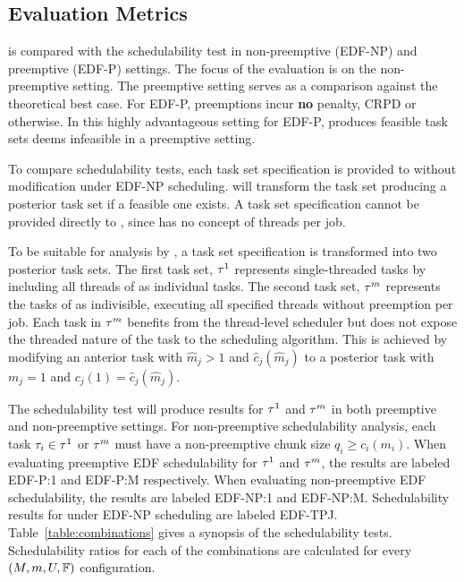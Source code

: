 \subsection{Evaluation Metrics}

\tpj{} is compared with the \npchunks{} schedulability test in
non-preemptive (EDF-NP) and preemptive (EDF-P) settings. The focus of
the evaluation is on the non-preemptive setting. The preemptive
setting serves as a comparison against the theoretical best case. For EDF-P,
preemptions incur \textbf{no} penalty, CRPD or otherwise. In this
highly advantageous setting for EDF-P, \tpj{} produces
feasible task sets \npchunks{} deems infeasible in a
preemptive setting.

To compare schedulability tests, each task set specification \ants{}
is provided to \tpj{} without modification under EDF-NP
scheduling. \tpj{} will transform the task set producing a
posterior task set \tasks{} if a feasible one exists. A task set
specification \ants{} cannot be provided directly to \npchunks{},
since \npchunks{} has no concept of threads per job. 

To be suitable for analysis by \npchunks{}, a task set specification
\ants{} is transformed into two posterior task sets. The first task
set, ${\tau{}^1}$ represents single-threaded tasks by including all
threads of \ants{} as individual tasks. The second task set,
${\tau{}^m}$ represents the tasks of \ants{} as indivisible,
executing all specified threads without preemption per job. Each task
in ${\tau{}^m}$ benefits from the  thread-level scheduler but does
not expose the threaded nature of the task to the scheduling
algorithm. This is achieved by modifying an anterior task  with
${\hat{m}_j > 1}$ and ${\hat{c}_j(\hat{m}_j)}$ to a posterior task
 with ${m_j = 1}$ and ${c_j(1) = \hat{c}_j(\hat{m}_j)}$. 

The \npchunks{} schedulability test will produce results for
${\tau{}^1}$ and ${\tau{}^m}$ in both preemptive and
non-preemptive settings. For non-preemptive schedulability analysis,
each task ${\tau_{i} \in \tau{}^1}$ or ${\tau{}^m}$ must have a
non-preemptive chunk size ${q_i \ge c_i(m_i)}$. When evaluating
preemptive EDF schedulability for ${\tau{}^1}$ and ${\tau{}^m}$,
the results are labeled EDF-P:1 and EDF-P:M respectively. When
evaluating non-preemptive EDF schedulability, the results are labeled
EDF-NP:1 and EDF-NP:M. Schedulability results for \tpj{} under EDF-NP
scheduling are labeled EDF-TPJ. Table~\ref{table:combinations} gives a
synopsis of the schedulability tests. Schedulability ratios for each
of the combinations are calculated for every ${(M, m, U, \mathbb{F}{})}$ 
configuration.

